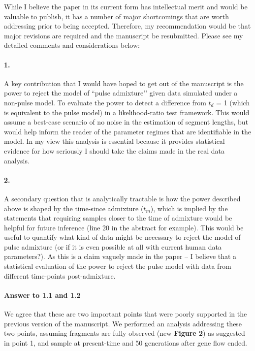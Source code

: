 \documentclass[11pt]{article}
\let\oldparagraph\paragraph
\renewcommand{\paragraph}[1]{\oldparagraph{#1}\mbox{}}
\begin{document}
While I believe the paper in its current form has intellectual merit and would be valuable to publish, it has a number of major shortcomings that are worth addressing prior to being accepted. Therefore, my recommendation would be that major revisions are required and the manuscript be resubmitted. Please see my detailed comments and considerations below: 

\paragraph{1.}
A key contribution that I would have hoped to get out of the manuscript is the power to reject the model of ``pulse admixture’’ given data simulated under a non-pulse model. To evaluate the power to detect a difference from $t_d$ = 1 (which is equivalent to the pulse model) in a likelihood-ratio test framework. This would assume a best-case scenario of no noise in the estimation of segment lengths, but would help inform the reader of the parameter regimes that are identifiable in the model. In my view this analysis is essential because it provides statistical evidence for how seriously I should take the claims made in the real data analysis.

\paragraph{2.}
A secondary question that is analytically tractable is how the power described above is shaped by the time-since admixture ($t_m$), which is implied by the statements that requiring samples closer to the time of admixture would be helpful for future inference (line 20 in the abstract for example). This would be useful to quantify what kind of data might be necessary to reject the model of pulse admixture (or if it is even possible at all with current human data parameters?). As this is a claim vaguely made in the paper – I believe that a statistical evaluation of the power to reject the pulse model with data from different time-points post-admixture. 

\paragraph{Answer to 1.1 and 1.2}
We agree that these are two important points that were poorly supported in the previous version of the manuscript. We performed an analysis addressing these two points, assuming fragments are fully observed (new \textbf{Figure 2}) as suggested in point 1, and sample at present-time and 50 generations after gene flow ended.
\end{document}
